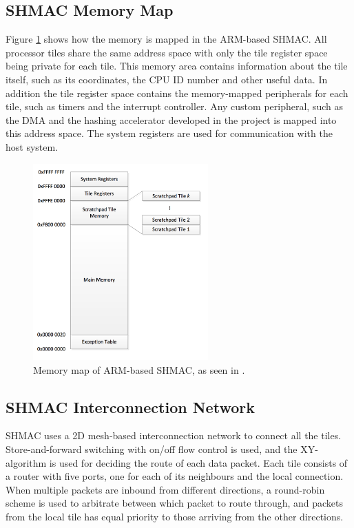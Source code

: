 \subsection{SHMAC Memory Map}

Figure \ref{fig:shmac-memory} shows how the memory is mapped in the ARM-based SHMAC. All
processor tiles share the same address space with only the tile register space being
private for each tile. This memory area contains information about the tile itself, such as its coordinates,
the CPU ID number and other useful data. In addition the tile register space contains the memory-mapped
peripherals for each tile, such as timers and the interrupt controller.
Any custom peripheral, such as the DMA and the hashing accelerator developed in the project is mapped into this address space.
The system registers are used for communication with the host system.

\begin{figure}[htb]
    \centering
    \includegraphics[width=0.6\textwidth]{Figures/Heterogeneous/SHMACMemory}
    \caption{Memory map of ARM-based SHMAC, as seen in \cite{shmac-plan}.}
    \label{fig:shmac-memory}
\end{figure}

\subsection{SHMAC Interconnection Network}

SHMAC uses a 2D mesh-based interconnection network to connect all the tiles.
Store-and-forward switching with on/off flow control is used, and the XY-algorithm is used for deciding the route of each data packet.
Each tile consists of a router with five ports, one for each of its neighbours and the local connection.
When multiple packets are inbound from different directions, a round-robin scheme is used to arbitrate between which
packet to route through, and packets from the local tile has equal priority to those arriving from the other directions.

